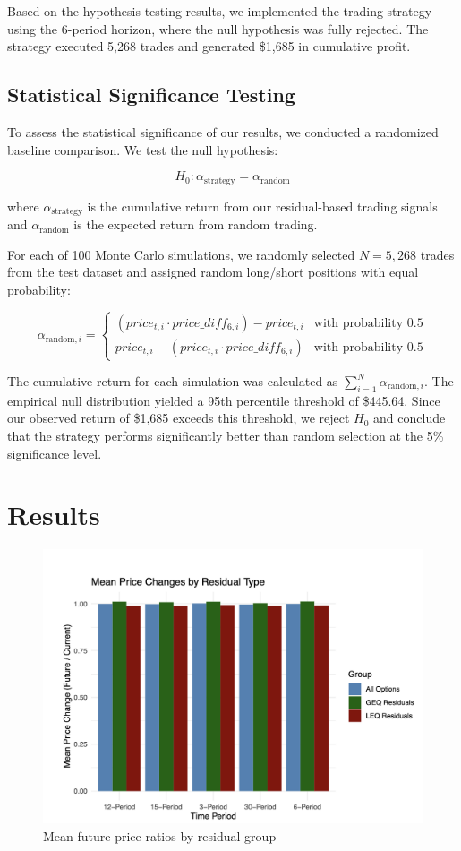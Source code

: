 \documentclass{article}
\begin{document}
Based on the hypothesis testing results, we implemented the trading strategy using the 6-period horizon, where the null hypothesis was fully rejected. The strategy executed 5,268 trades and generated \$1,685 in cumulative profit.

\subsection{Statistical Significance Testing}

To assess the statistical significance of our results, we conducted a randomized baseline comparison. We test the null hypothesis:

\[
H_0: \alpha_{\text{strategy}} = \alpha_{\text{random}}
\]

where $\alpha_{\text{strategy}}$ is the cumulative return from our residual-based trading signals and $\alpha_{\text{random}}$ is the expected return from random trading.

For each of 100 Monte Carlo simulations, we randomly selected $N = 5,268$ trades from the test dataset and assigned random long/short positions with equal probability:

\[
\alpha_{\text{random},i} = \begin{cases}
(price_{t,i} \cdot price\_diff_{6,i}) - price_{t,i} & \text{with probability } 0.5 \\
price_{t,i} - (price_{t,i} \cdot price\_diff_{6,i}) & \text{with probability } 0.5
\end{cases}
\]

The cumulative return for each simulation was calculated as $\sum_{i=1}^{N} \alpha_{\text{random},i}$. The empirical null distribution yielded a 95th percentile threshold of \$445.64. Since our observed return of \$1,685 exceeds this threshold, we reject $H_0$ and conclude that the strategy performs significantly better than random selection at the 5\% significance level.

\section{Results}

\begin{figure}[h]
  \centering
  \includegraphics[width=0.8\linewidth]{data/results/mean_price_diff.png}
  \caption{Mean future price ratios by residual group}
  \label{fig:price-diff}
\end{figure}
\end{document}
